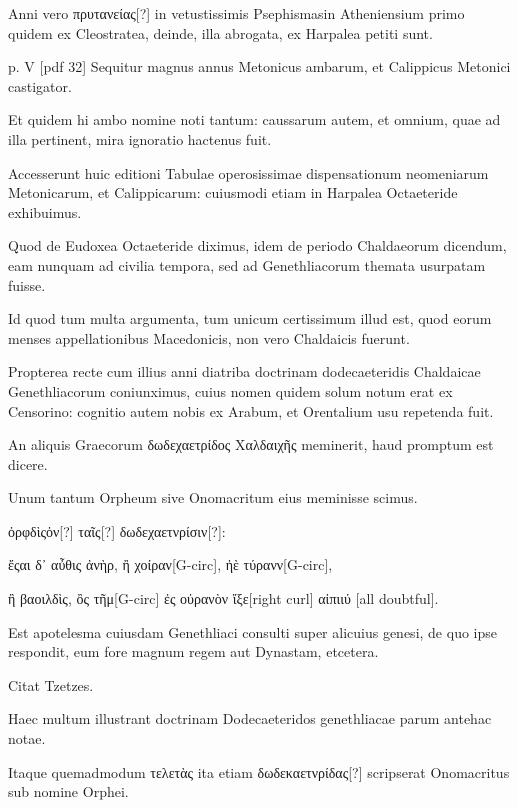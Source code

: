 \begin{parnumbers}
Anni vero \textgreek{πρυτανείας[?]} in vetustissimis Psephismasin
Atheniensium primo quidem ex Cleostratea, deinde, illa
abrogata, ex Harpalea petiti sunt.

\clearpage
p. V [pdf 32]
Sequitur magnus annus Metonicus
ambarum, et Calippicus Metonici castigator.

Et quidem hi
ambo nomine noti tantum: caussarum autem, et omnium, quae ad
illa pertinent, mira ignoratio hactenus fuit.

Accesserunt huic editioni
Tabulae operosissimae dispensationum neomeniarum Metonicarum,
et Calippicarum: cuiusmodi etiam in Harpalea Octaeteride
exhibuimus. 

Quod de Eudoxea Octaeteride diximus, idem de
periodo Chaldaeorum dicendum, eam nunquam ad civilia tempora,
sed ad Genethliacorum themata usurpatam fuisse.

Id quod tum
multa argumenta, tum unicum certissimum illud est, quod eorum
menses appellationibus Macedonicis, non vero Chaldaicis fuerunt.

Propterea recte cum illius anni diatriba doctrinam dodecaeteridis
Chaldaicae Genethliacorum coniunximus, cuius nomen quidem
solum notum erat ex Censorino: cognitio autem nobis ex Arabum,
et Orentalium usu repetenda fuit.

An aliquis Graecorum \textgreek{δωδεχαετρίδος Χαλδαιχῆς}
meminerit, haud promptum est dicere.

Unum tantum Orpheum sive Onomacritum eius meminisse scimus. 

\textgreek{ὀρφδὶςὀν[?] ταῖς[?] δωδεχαετνρίσιν[?]:}

\begin{greek}
ἔςαι δ᾽ αὖθις ἀνὴρ, ἢ χοίραν[G-circ], ἠὲ τύρανν[G-circ],

ἢ βαοιλδὶς, ὂς τῆμ[G-circ] ἐς οὐρανὸν ἴξε[right curl] αἰπιιύ [all doubtful].
\end{greek}

Est apotelesma cuiusdam Genethliaci consulti super alicuius genesi,
de quo ipse respondit, eum fore magnum regem aut Dynastam, etcetera.

Citat Tzetzes. 

Haec multum illustrant doctrinam Dodecaeteridos
genethliacae parum antehac notae.

Itaque quemadmodum \textgreek{τελετὰς}
ita etiam \textgreek{δωδεκαετνρίδας[?]} scripserat Onomacritus sub nomine
Orphei.


\end{parnumbers}
